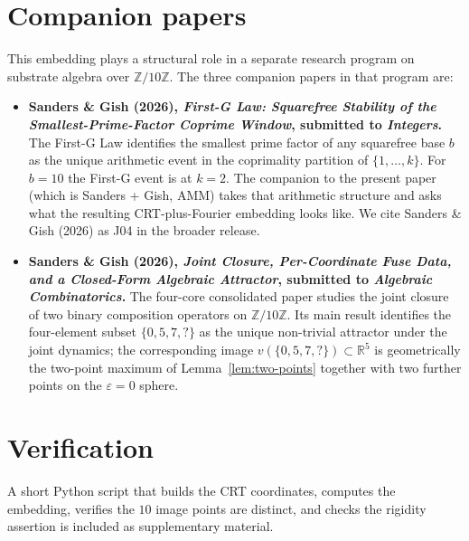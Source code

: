 \documentclass[11pt,reqno]{amsart}
\theoremstyle{definition}
\newcommand{\Z}{\mathbb{Z}}
\newcommand{\R}{\mathbb{R}}
\begin{document}
\section{Companion papers}
\label{sec:companions}

This embedding plays a structural role in a separate research
program on substrate algebra over $\Z/10\Z$. The three
companion papers in that program are:

\begin{itemize}[leftmargin=*]
\item \textbf{Sanders \& Gish (2026), \emph{First-G Law: Squarefree
  Stability of the Smallest-Prime-Factor Coprime Window},
  submitted to \emph{Integers}.} The First-G Law identifies the
  smallest prime factor of any squarefree base $b$ as the unique
  arithmetic event in the coprimality partition of
  $\{1, \ldots, k\}$. For $b = 10$ the First-G event is at
  $k = 2$. The companion to the present paper (which is
  Sanders + Gish, AMM) takes that arithmetic structure and asks
  what the resulting CRT-plus-Fourier embedding looks like. We
  cite Sanders \& Gish (2026) as J04 in the broader release.
\item \textbf{Sanders \& Gish (2026), \emph{Joint Closure,
  Per-Coordinate Fuse Data, and a Closed-Form Algebraic Attractor},
  submitted to \emph{Algebraic Combinatorics}.} The four-core
  consolidated paper studies the joint closure of two binary
  composition operators on $\Z/10\Z$. Its main result identifies
  the four-element subset $\{0, 5, 7, ?\}$ as the unique non-trivial
  attractor under the joint dynamics; the corresponding image
  $v(\{0,5,7,?\}) \subset \R^5$ is geometrically the two-point
  maximum of Lemma~\ref{lem:two-points} together with two further
  points on the $\varepsilon = 0$ sphere.
\end{itemize}

\section*{Verification}

A short Python script that builds the CRT coordinates, computes
the embedding, verifies the $10$ image points are distinct, and
checks the rigidity assertion is included as supplementary
material.
\end{document}
